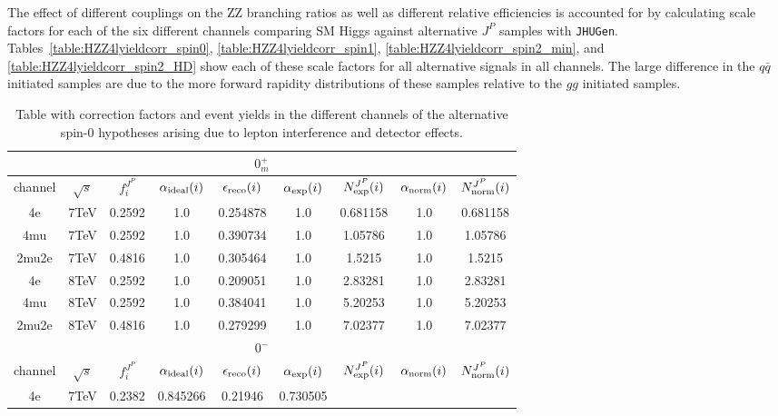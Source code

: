The effect of different couplings on the ZZ branching 
ratios as well as different relative efficiencies is accounted
for by calculating scale factors for each of the six different 
channels comparing SM Higgs against alternative $J^P$ samples 
with \verb+JHUGen+.  Tables~\ref{table:HZZ4lyieldcorr_spin0},
\ref{table:HZZ4lyieldcorr_spin1},
\ref{table:HZZ4lyieldcorr_spin2_min},
and \ref{table:HZZ4lyieldcorr_spin2_HD} show
 each of these scale
factors for all alternative signals in all channels.  The large
difference in the $q\bar{q}$ initiated samples are due to the
more forward rapidity distributions of these samples relative to 
the $gg$ initiated samples.  

\begin{table}[b]
\centering
\caption{
Table with correction factors and event yields in the different
channels of the alternative spin-0 hypotheses arising
due to lepton interference and detector effects.}
\centering %
\begin{tabular}{c c c c c c c c c} %
\hline \hline
 \multicolumn{9}{|c|}{$0^{+}_{m}$} \\ \hline 
channel & $\sqrt{s}$ & $f_{i}^{J^P}$ & $\alpha_{\rm ideal} (i)$ & $\epsilon_{\rm reco} (i)$ & $\alpha_{\rm exp} (i)$ & $N^{J^P}_{\rm exp} (i)$ & $\alpha_{\rm norm} (i)$ & $N^{J^P}_{\rm norm} (i)$\\ \hline 
4e & 7TeV & 0.2592 &  1.0  & 0.254878 &  1.0  & 0.681158 &  1.0  & 0.681158 \\ \hline 4mu & 7TeV & 0.2592 &  1.0  & 0.390734 &  1.0  & 1.05786 &  1.0  & 1.05786 \\ \hline 2mu2e & 7TeV & 0.4816 &  1.0  & 0.305464 &  1.0  & 1.5215 &  1.0  & 1.5215 \\ \hline \hline 4e & 8TeV & 0.2592 &  1.0  & 0.209051 &  1.0  & 2.83281 &  1.0  & 2.83281 \\ \hline 4mu & 8TeV & 0.2592 &  1.0  & 0.384041 &  1.0  & 5.20253 &  1.0  & 5.20253 \\ \hline 2mu2e & 8TeV & 0.4816 &  1.0  & 0.279299 &  1.0  & 7.02377 &  1.0  & 7.02377 \\ \hline \hline  \multicolumn{9}{|c|}{$0^{-}$} \\ \hline 
channel & $\sqrt{s}$ & $f_{i}^{J^P}$ & $\alpha_{\rm ideal} (i)$ & $\epsilon_{\rm reco} (i)$ & $\alpha_{\rm exp} (i)$ & $N^{J^P}_{\rm exp} (i)$ & $\alpha_{\rm norm} (i)$ & $N^{J^P}_{\rm norm} (i)$\\ \hline 
4e & 7TeV & 0.2382 & 0.845266 & 0.21946 & 0.730505

\end{tabular}
\end{table}
